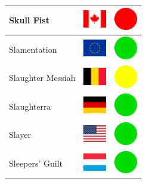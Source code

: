 \documentclass[12pt, a4paper, twoside]{report}
\begin{document}
\begin{center}
\begin{longtable}{|p{5cm}|p{2cm}|p{2cm}|}
 Skull Fist                                                 & \includegraphics[width=1cm]{../4x3/ca} &   \includegraphics[width=1cm]{../likes/n} \\ \hline
 Slamentation                                               & \includegraphics[width=1cm]{../4x3/eu} &   \includegraphics[width=1cm]{../likes/y} \\ \hline
 Slaughter Messiah                                          & \includegraphics[width=1cm]{../4x3/be} &   \includegraphics[width=1cm]{../likes/m} \\ \hline
 Slaughterra                                                & \includegraphics[width=1cm]{../4x3/de} &   \includegraphics[width=1cm]{../likes/y} \\ \hline
 Slayer                                                     & \includegraphics[width=1cm]{../4x3/us} &   \includegraphics[width=1cm]{../likes/y} \\ \hline
 Sleepers' Guilt                                            & \includegraphics[width=1cm]{../4x3/lu} &   \includegraphics[width=1cm]{../likes/y} \\ \hline

\end{longtable}
\end{center}
\end{document}
